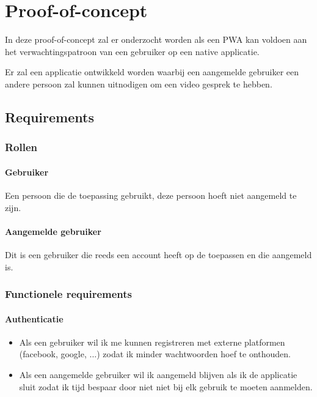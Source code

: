 \chapter{Proof-of-concept}
\label{ch:Proof-of-concept}


In deze proof-of-concept zal er onderzocht worden als een PWA kan voldoen aan het verwachtingspatroon van een gebruiker op een native applicatie.

Er zal een applicatie ontwikkeld worden waarbij een aangemelde gebruiker een  andere persoon zal kunnen uitnodigen om een video gesprek te hebben. 

 \section{Requirements}

 \subsection{Rollen}
 
 \subsubsection{Gebruiker}
	Een persoon die de toepassing gebruikt, deze persoon hoeft niet aangemeld te zijn.
 
 \subsubsection{Aangemelde gebruiker}
 	Dit is een gebruiker die reeds een account heeft op de toepassen en die aangemeld is.
 
 \subsection{Functionele requirements}
 	\subsubsection{Authenticatie}
	 	\begin{itemize}
		 	\item Als een gebruiker wil ik me kunnen registreren met externe platformen (facebook, google, ...) zodat ik minder wachtwoorden hoef te onthouden.
		 	\item Als een aangemelde gebruiker wil ik aangemeld blijven als ik de applicatie sluit zodat ik tijd bespaar door niet niet bij elk gebruik te moeten aanmelden.
	 	\end{itemize}
	 	
